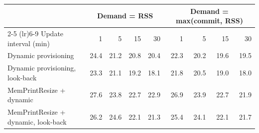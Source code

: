 \begin{tabular}{lrrrrrrrr}
\toprule
 & \multicolumn{4}{c}{Demand = RSS} & \multicolumn{4}{c}{Demand = max(commit, RSS)} \\
\cmidrule(lr){2-5} \cmidrule(lr){6-9}
Update interval (min) & 1 & 5 & 15 & 30 & 1 & 5 & 15 & 30 \\
\midrule
Dynamic provisioning & 24.4 & 21.2 & 20.8 & 20.4 & 22.3 & 20.2 & 19.6 & 19.5 \\
Dynamic provisioning, look-back & 23.3 & 21.1 & 19.2 & 18.1 & 21.8 & 20.5 & 19.0 & 18.0 \\
MemPrintResize + dynamic & 27.6 & 23.8 & 22.7 & 22.9 & 26.9 & 23.9 & 22.7 & 21.9 \\
MemPrintResize + dynamic, look-back & 26.2 & 24.6 & 22.1 & 21.3 & 25.4 & 24.1 & 22.1 & 21.7 \\
\bottomrule
\end{tabular}
